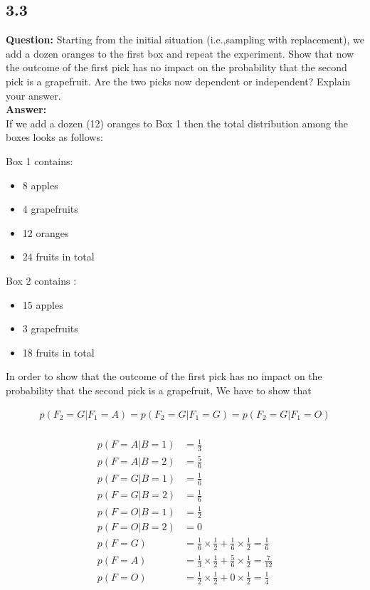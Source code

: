 \documentclass[a4paper]{article}
\begin{document}
\subsection*{3.3}

\textbf{Question:} Starting from the initial situation (i.e.,sampling with replacement), we add a dozen oranges to the first box and repeat the experiment. Show that now the outcome of the first pick has no impact on the probability that the second pick is a grapefruit. Are the two picks now dependent or independent? Explain your answer.\\

\textbf{Answer:}\\

If we add a dozen (12) oranges to Box 1 then the total distribution among the boxes looks as follows:

Box 1 contains:

\begin{itemize}
	\item 8 apples
	\item 4 grapefruits
	\item 12 oranges
	\item 24 fruits in total
\end{itemize}

Box 2 contains :

\begin{itemize}
	\item 15 apples
	\item 3 grapefruits
	\item 18 fruits in total
\end{itemize}

In order to show that the outcome of the first pick has no impact on the probability that the second pick is a grapefruit, We have to show that

\begin{align*}
	p(F_2 = G | F_1 = A) = p(F_2 = G | F_1 = G) = p(F_2 = G | F_1 = O)\\
\end{align*}

\begin{align*}
	p(F = A | B = 1) &= \frac{1}{3}\\
	p(F = A | B = 2) &= \frac{5}{6}\\
	p(F = G | B = 1) &= \frac{1}{6}\\
	p(F = G | B = 2) &= \frac{1}{6}\\
	p(F = O | B = 1) &=  \frac{1}{2}\\
	p(F = O | B = 2) &=  0\\
	p(F = G) &= \frac{1}{6} \times \frac{1}{2} + \frac{1}{6} \times \frac{1}{2} = \frac{1}{6}\\
	p(F = A) &= \frac{1}{3} \times  \frac{1}{2} + \frac{5}{6} \times \frac{1}{2} = \frac{7}{12}\\
	p(F = O) &= \frac{1}{2} \times \frac{1}{2} + 0 \times \frac{1}{2} =  \frac{1}{4}
\end{align*}
\end{document}
